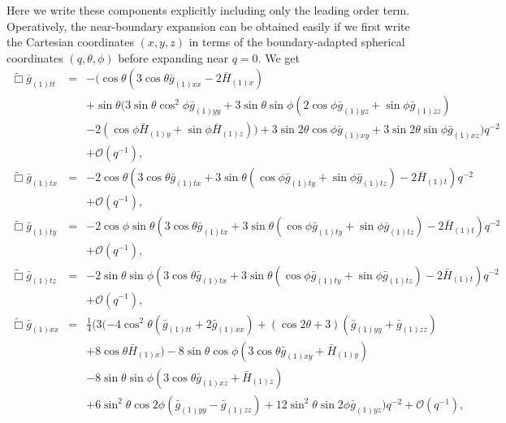 \documentclass[a4paper,11pt]{article}
\begin{document}
Here we write these components explicitly including only the leading order term. Operatively, the near-boundary expansion can be obtained easily if we first write the Cartesian coordinates $(x,y,z)$ in terms of the boundary-adapted spherical coordinates $(q,\theta,\phi)$ before expanding near $q=0$. We get
\begin{eqnarray}\label{eqn:efett}
\tilde{\Box}\bar{g}_{(1)tt}&=&-(\cos \theta (3 \cos \theta  \bar{g}_{(1)xx}-2 \bar{H}_{(1)x}) \nonumber \\
&&+\sin\theta (3 \sin \theta \cos^2\phi \bar{g}_{(1) yy}+3
   \sin \theta  \sin \phi (2 \cos \phi  \bar{g}_{(1) yz}+\sin\phi
   \bar{g}_{(1) zz}) \nonumber \\
   &&-2 (\cos \phi \bar{H}_{(1) y}+\sin\phi
   \bar{H}_{(1) z}))+3 \sin 2 \theta  \cos \phi \bar{g}_{(1) xy}+3
   \sin 2 \theta  \sin \phi \bar{g}_{(1) xz})q^{-2} \nonumber \\
&&+\mathcal{O}(q^{-1}),\\
%
\label{eqn:efetx}
\tilde{\Box}\bar{g}_{(1)tx}&=&-2 \cos \theta (3 \cos\theta \bar{g}_{(1) tx}+3 \sin \theta
   (\cos \phi  \bar{g}_{(1) ty}+\sin \phi  \bar{g}_{(1)tz})-2
   \bar{H}_{(1) t})    q^{-2} \nonumber \\
&&+\mathcal{O}(q^{-1}),\\
%
\label{eqn:efety}
\tilde{\Box}\bar{g}_{(1)ty}&=&-2 \cos \phi \sin\theta (3 \cos\theta \bar{g}_{(1) tx}+3 \sin \theta
   (\cos \phi  \bar{g}_{(1) ty}+\sin \phi  \bar{g}_{(1)tz})-2
   \bar{H}_{(1) t})    q^{-2} \nonumber \\
&&+\mathcal{O}(q^{-1}),\\
%
\label{eqn:efetz}
\tilde{\Box}\bar{g}_{(1)tz}&=&-2 \sin \theta \sin\phi (3 \cos\theta \bar{g}_{(1) tx}+3 \sin \theta
   (\cos \phi \bar{g}_{(1) ty}+\sin \phi  \bar{g}_{(1)tz})-2
   \bar{H}_{(1) t})    q^{-2} \nonumber \\
&&+\mathcal{O}(q^{-1}),\\
%
\label{eqn:efexx}
\tilde{\Box}\bar{g}_{(1)xx}&=&\frac{1}{4} (3 (-4 \cos ^2\theta (\bar{g}_{(1) tt}+2 \bar{g}_{(1)
   xx})+(\cos 2 \theta +3) (\bar{g}_{(1) yy}+\bar{g}_{(1)
zz}) \nonumber \\
&&+8 \cos \theta  \bar{H}_{(1) x})-8 \sin \theta  \cos \phi 
   (3 \cos \theta  \bar{g}_{(1)xy}+\bar{H}_{(1) y}) \nonumber \\
   &&-8 \sin\theta \sin\phi (3 \cos\theta \bar{g}_{(1) xz}+\bar{H}_{(1) z}) \nonumber \\
   &&+6 \sin^2\theta  \cos 2 \phi  (\bar{g}_{(1)yy}-\bar{g}_{(1)zz})+12
   \sin^2\theta  \sin 2 \phi  \bar{g}_{(1) yz})    q^{-2} +\mathcal{O}(q^{-1}),\\

\end{eqnarray}
\end{document}

